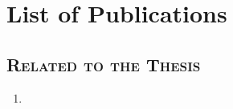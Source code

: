 \chapter*{List of Publications}
\label{pub:pub01}



\section{\fontsize{12pt}{16pt}\scshape Related to the Thesis}

\begin{enumerate}
    \item {}
\end{enumerate}



